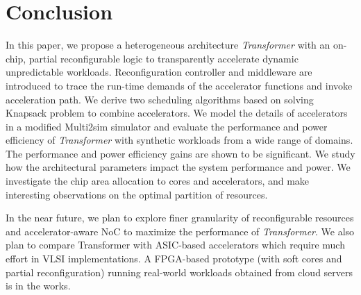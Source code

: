 \section{Conclusion}
\label{sec_concl}

In this paper, we propose a heterogeneous architecture {\em
  Transformer} with an on-chip, partial reconfigurable logic to
transparently accelerate dynamic unpredictable workloads.
Reconfiguration controller and middleware are introduced to trace the
run-time demands of the accelerator functions and invoke acceleration
path. We derive two scheduling algorithms based on solving Knapsack
problem to combine accelerators. We model the details of
accelerators in a modified Multi2sim simulator and evaluate the
performance and power efficiency of {\em Transformer} with synthetic
workloads from a wide range of domains. The performance and power
efficiency gains are shown to be significant. We study how the 
architectural parameters impact the system performance and power. We
investigate the chip area allocation to cores and accelerators, and make interesting observations on the optimal partition of resources. 

In the near future, we plan to explore finer granularity
of reconfigurable resources and accelerator-aware NoC to maximize the
performance of {\em Transformer}. We also plan to compare Transformer
with ASIC-based accelerators which require much effort in VLSI
implementations. A FPGA-based prototype (with soft cores and partial
reconfiguration) running real-world workloads obtained from cloud
servers is in the works.

